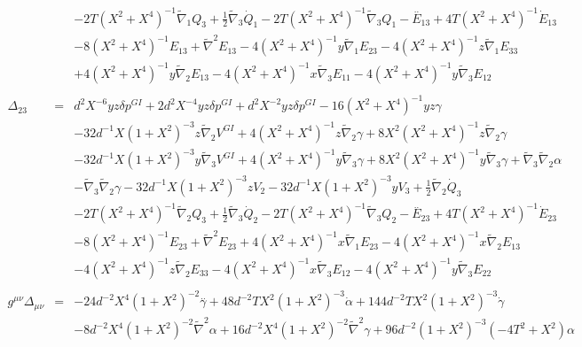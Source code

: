 \documentclass[10pt,letterpaper]{article}
\numberwithin{equation}{section}
\begin{document}
\begin{eqnarray}
&& - 2 T (X^2 + X^4)^{-1} \tilde{\nabla}_{1}Q_{3} + \tfrac{1}{2} \tilde{\nabla}_{3}\dot{Q}_{1} - 2 T (X^2 + X^4)^{-1} \tilde{\nabla}_{3}Q_{1}- \overset{..}{E}_{13} + 4 T (X^2 + X^4)^{-1} \dot{E}_{13} \nonumber \\ 
&& - 8 (X^2 + X^4)^{-1} E_{13} + \tilde{\nabla}^{2}E_{13} - 4 (X^2 + X^4)^{-1} y \tilde{\nabla}_{1}E_{23} - 4 (X^2 + X^4)^{-1} z \tilde{\nabla}_{1}E_{33} \nonumber \\ 
&& + 4 (X^2 + X^4)^{-1} y \tilde{\nabla}_{2}E_{13} - 4 (X^2 + X^4)^{-1} x \tilde{\nabla}_{3}E_{11} - 4 (X^2 + X^4)^{-1} y \tilde{\nabla}_{3}E_{12}
\\  \nonumber\\ 
\Delta_{23}&=& d^2 X^{-6} y z \delta p^{GI}{} + 2 d^2 X^{-4} y z \delta p^{GI}{} + d^2 X^{-2} y z \delta p^{GI}{} - 16 (X^2 + X^4)^{-1} y z \gamma \nonumber \\ 
&& - 32 d^{-1} X (1 + X^2)^{-3} z \tilde{\nabla}_{2}V^{GI}{} + 4 (X^2 + X^4)^{-1} z \tilde{\nabla}_{2}\gamma + 8 X^2 (X^2 + X^4)^{-1} z \tilde{\nabla}_{2}\gamma \nonumber \\ 
&& - 32 d^{-1} X (1 + X^2)^{-3} y \tilde{\nabla}_{3}V^{GI}{} + 4 (X^2 + X^4)^{-1} y \tilde{\nabla}_{3}\gamma + 8 X^2 (X^2 + X^4)^{-1} y \tilde{\nabla}_{3}\gamma + \tilde{\nabla}_{3}\tilde{\nabla}_{2}\alpha \nonumber \\ 
&& -  \tilde{\nabla}_{3}\tilde{\nabla}_{2}\gamma -32 d^{-1} X (1 + X^2)^{-3} z V_{2} - 32 d^{-1} X (1 + X^2)^{-3} y V_{3} + \tfrac{1}{2} \tilde{\nabla}_{2}\dot{Q}_{3} \nonumber \\ 
&& - 2 T (X^2 + X^4)^{-1} \tilde{\nabla}_{2}Q_{3} + \tfrac{1}{2} \tilde{\nabla}_{3}\dot{Q}_{2} - 2 T (X^2 + X^4)^{-1} \tilde{\nabla}_{3}Q_{2}- \overset{..}{E}_{23} + 4 T (X^2 + X^4)^{-1} \dot{E}_{23} \nonumber \\ 
&& - 8 (X^2 + X^4)^{-1} E_{23} + \tilde{\nabla}^{2}E_{23} + 4 (X^2 + X^4)^{-1} x \tilde{\nabla}_{1}E_{23} - 4 (X^2 + X^4)^{-1} x \tilde{\nabla}_{2}E_{13} \nonumber \\ 
&& - 4 (X^2 + X^4)^{-1} z \tilde{\nabla}_{2}E_{33} - 4 (X^2 + X^4)^{-1} x \tilde{\nabla}_{3}E_{12} - 4 (X^2 + X^4)^{-1} y \tilde{\nabla}_{3}E_{22}
\\  \nonumber\\ 
g^{\mu\nu}\Delta_{\mu\nu}&=& -24 d^{-2} X^4 (1 + X^2)^{-2} \overset{..}{\gamma} + 48 d^{-2} T X^2 (1 + X^2)^{-3} \dot{\alpha} + 144 d^{-2} T X^2 (1 + X^2)^{-3} \dot{\gamma} \nonumber \\ 
&& - 8 d^{-2} X^4 (1 + X^2)^{-2} \tilde{\nabla}^{2}\alpha + 16 d^{-2} X^4 (1 + X^2)^{-2} \tilde{\nabla}^{2}\gamma + 96 d^{-2} (1 + X^2)^{-3} (-4 T^2 + X^2) \alpha \nonumber \\ 

\end{eqnarray}
\end{document}
